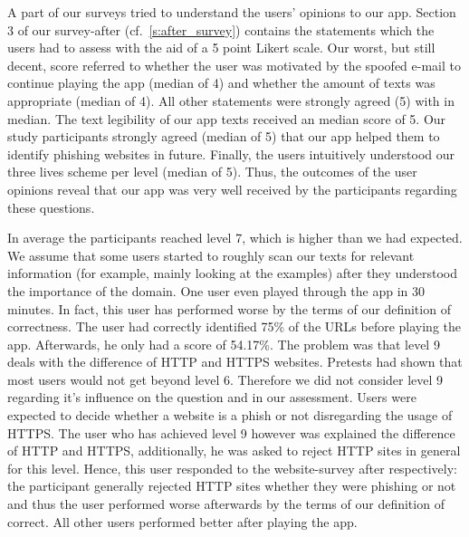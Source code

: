 \begin{description}[leftmargin=0cm]
	\item[User Opinions to App:] A part of our surveys tried to understand the users' opinions to our app.
	Section 3 of our survey-after (cf.~\autoref{s:after_survey}) contains the statements which the users had to assess with the aid of a 5 point Likert scale.
	Our worst, but still decent, score referred to whether the user was motivated by the spoofed e-mail to continue playing the app (median of 4) and whether the amount of texts was appropriate (median of 4).
	All other statements were strongly agreed (5) with in median.
	The text legibility of our app texts received an median score of 5.
	Our study participants strongly agreed (median of 5) that our app helped them to identify phishing websites in future.
	Finally, the users intuitively understood our three lives scheme per level (median of 5).
	Thus, the outcomes of the user opinions reveal that our app was very well received by the participants regarding these questions.
	\item[Achieved Levels:] In average the participants reached level 7, which is higher than we had expected.
	We assume that some users started to roughly scan our texts for relevant information (for example, mainly looking at the examples) after they understood the importance of the domain.
	One user even played through the app in 30 minutes.
	In fact, this user has performed worse by the terms of our definition of correctness.
	The user had correctly identified 75\% of the URLs before playing the app.
	Afterwards, he only had a score of 54.17\%.
	The problem was that level 9 deals with the difference of HTTP and HTTPS websites.
	Pretests had shown that most users would not get beyond level 6. Therefore we did not consider level 9 regarding it's influence on the question and in our assessment.
	Users were expected to decide whether a website is a phish or not disregarding the usage of HTTPS.
	The user who has achieved level 9 however was explained the difference of HTTP and HTTPS, additionally, he was asked to reject HTTP sites in general for this level.
	Hence, this user responded to the website-survey after respectively: the participant generally rejected HTTP sites whether they were phishing or not and thus the user performed worse afterwards by the terms of our definition of correct.
	All other users performed better after playing the app.
	\item[Relation Between Achieved Level and Identified Websites] 

\end{description}
